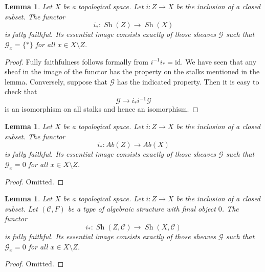 \documentclass{stacks-project}
\theoremstyle{plain}
\newtheorem{lemma}[subsection]{Lemma}
\theoremstyle{definition}
\theoremstyle{remark}
\numberwithin{equation}{subsection}
\def\Sh{\mathop{\mathit{Sh}}\nolimits}
\begin{document}
\begin{lemma}
\label{lemma-equivalence-categories-closed}
Let $X$ be a topological space.
Let $i : Z \to X$ be the inclusion of a closed subset.
The functor
$$
i_* : \Sh(Z) \longrightarrow \Sh(X)
$$
is fully faithful. Its essential image consists exactly
of those sheaves $\mathcal{G}$ such that
$\mathcal{G}_x = \{*\}$ for all $x \in X \setminus Z$.
\end{lemma}

\begin{proof}
Fully faithfulness follows formally from $i^{-1} i_* = \text{id}$.
We have seen that any sheaf in the image of the functor has
the property on the stalks mentioned in the lemma. Conversely, suppose
that $\mathcal{G}$ has the indicated property.
Then it is easy to check that
$$
\mathcal{G} \to i_* i^{-1} \mathcal{G}
$$
is an isomorphism on all stalks and hence an isomorphism.
\end{proof}

\begin{lemma}
\label{lemma-equivalence-categories-closed-abelian}
Let $X$ be a topological space.
Let $i : Z \to X$ be the inclusion of a closed subset.
The functor
$$
i_* : \textit{Ab}(Z) \longrightarrow \textit{Ab}(X)
$$
is fully faithful. Its essential image consists exactly
of those sheaves $\mathcal{G}$ such that
$\mathcal{G}_x = 0$ for all $x \in X \setminus Z$.
\end{lemma}

\begin{proof}
Omitted.
\end{proof}

\begin{lemma}
\label{lemma-equivalence-categories-closed-structures}
Let $X$ be a topological space.
Let $i : Z \to X$ be the inclusion of a closed subset.
Let $(\mathcal{C}, F)$ be a type of algebraic structure
with final object $0$. The functor
$$
i_* : \Sh(Z, \mathcal{C}) \longrightarrow \Sh(X, \mathcal{C})
$$
is fully faithful. Its essential image consists exactly
of those sheaves $\mathcal{G}$ such that
$\mathcal{G}_x = 0$ for all $x \in X \setminus Z$.
\end{lemma}

\begin{proof}
Omitted.
\end{proof}
\end{document}
